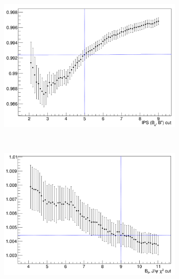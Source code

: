 \begin{figure}
    \centering
    \begin{subfigure}[b]{0.4\textwidth}
        \includegraphics[width=\textwidth]{./Figs/Selection/IPS.png}
        \caption{ }
        \label{fig:IPS_ratioKPi}
    \end{subfigure}
    ~ %
    \begin{subfigure}[b]{0.4\textwidth}
        \includegraphics[width=\textwidth]{./Figs/Selection/CHI2.png}
        \caption{ }
        \label{fig:CHI2_ratioKPi}
    \end{subfigure}
    ~ %


\end{figure}
